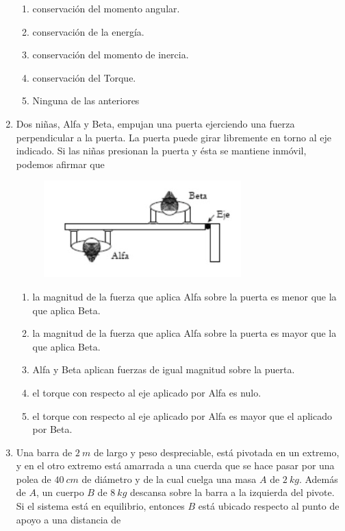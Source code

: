 \documentclass[letterpaper]{article}
\newenvironment{enumalf}
{\begin{enumerate}[label=\Alph*)]}
{\end{enumerate}}
\begin{document}
\begin{enumerate}
\begin{enumalf}
\item conservación del momento angular.
\item conservación de la energía.
\item conservación del momento de inercia. 
\item conservación del Torque.
\item Ninguna de las anteriores
\end{enumalf}

\item Dos niñas, Alfa y Beta, empujan una puerta ejerciendo una fuerza perpendicular a la puerta. La puerta puede girar libremente en torno al eje indicado. Si las niñas presionan la puerta y ésta se mantiene inmóvil, podemos afirmar que

\begin{figure}[h]
\centering
\includegraphics[scale=0.5]{alfabeta.png}
\end{figure}

\begin{enumalf}
\item la magnitud de la fuerza que aplica Alfa sobre la puerta es menor que la que aplica Beta.
\item la magnitud de la fuerza que aplica Alfa sobre la puerta es mayor que la que aplica Beta.
\item Alfa y Beta aplican fuerzas de igual magnitud sobre la puerta.
\item el torque con respecto al eje aplicado por Alfa es nulo.
\item el torque con respecto al eje aplicado por Alfa es mayor que el aplicado por Beta.
\end{enumalf}

\pagebreak

\item Una barra de $2\ \si{m}$ de largo y peso despreciable, está pivotada en un extremo, y en el otro extremo está amarrada a una cuerda que se hace pasar por una polea de $40\ \si{cm}$ de diámetro y de la cual cuelga una masa $A$ de $2\ \si{kg}$. Además de $A$, un cuerpo $B$ de $8\ \si{kg}$ descansa sobre la barra a la izquierda del pivote. Si el sistema está en equilibrio, entonces $B$ está ubicado respecto al punto de apoyo a una distancia de


\end{enumerate}
\end{document}
